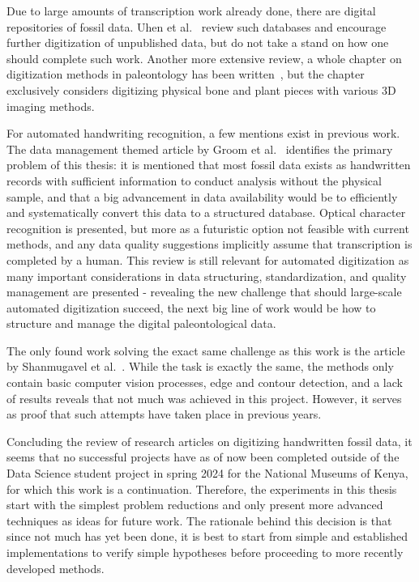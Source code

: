 \documentclass[english,twoside,openright]{UH_DS_MSc}
\begin{document}
Due to large amounts of transcription work already done, there are digital repositories of fossil data.
Uhen et al.~\cite{uhenCardCatalogsComputers2013} review such databases and encourage further 
digitization of unpublished data, but do not take a stand on how one should complete such work.
Another more extensive review, a whole chapter on digitization methods in paleontology has been written~\cite{mallisonDigitizingMethodsPaleontology2011},
but the chapter exclusively considers digitizing physical bone and plant pieces with various 3D imaging methods.

For automated handwriting recognition, a few mentions exist in previous work. The data management themed 
article by Groom et al.~\cite{groomImprovedStandardizationTranscribed2019} identifies the primary 
problem of this thesis: it is mentioned that most fossil data exists as handwritten records with sufficient information 
to conduct analysis without the physical sample, and that a big advancement in data availability would be to efficiently and 
systematically convert this data to a structured database. Optical character recognition is presented, but more as a futuristic option 
not feasible with current methods, and any data quality suggestions implicitly assume that transcription is completed 
by a human. This review is still relevant for automated digitization as many important considerations in data structuring,
standardization, and quality management are presented - revealing the new challenge that should large-scale automated digitization succeed,
the next big line of work would be how to structure and manage the digital paleontological data.

The only found work solving the exact same challenge as this work is the article by Shanmugavel et al.~\cite{shanmugavelHandwrittenOpticalCharacter2018}.
While the task is exactly the same, the methods only contain basic computer 
vision processes, edge and contour detection, and a lack of results reveals that not much was achieved in 
this project. However, it serves as proof that such attempts have taken place in previous years.

Concluding the review of research articles on digitizing handwritten fossil data, it seems that no successful projects
have as of now been completed outside of the Data Science student project in spring 2024 for the National 
Museums of Kenya, for which this work is a continuation. Therefore, the experiments in this thesis
start with the simplest problem reductions and only present more advanced techniques as ideas for future work.
The rationale behind this decision is that since not much has yet been done, it is best to start from 
simple and established implementations to verify simple hypotheses before proceeding to more recently developed methods.
\end{document}
